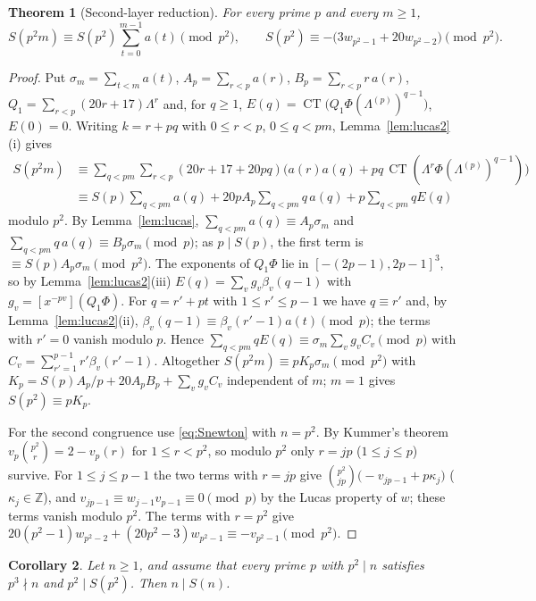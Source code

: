 \documentclass[11pt]{amsart}
\newtheorem{theorem}{Theorem}[section]
\newtheorem{corollary}[theorem]{Corollary}
\theoremstyle{definition}
\newcommand{\Z}{\mathbb{Z}}
\newcommand{\CT}{\operatorname{CT}}
\begin{document}
\begin{theorem}[Second-layer reduction]\label{thm:layer2}
For every prime $p$ and every $m\ge1$,
\[
S(p^2m)\equiv S(p^2)\sum_{t=0}^{m-1}a(t)\pmod{p^2},\qquad
S(p^2)\equiv-\big(3w_{p^2-1}+20w_{p^2-2}\big)\pmod{p^2}.
\]
\end{theorem}

\begin{proof}
Put $\sigma_m=\sum_{t<m}a(t)$, $A_p=\sum_{r<p}a(r)$, $B_p=\sum_{r<p}r\,a(r)$,
$Q_1=\sum_{r<p}(20r+17)\Lambda^r$ and, for $q\ge1$, $E(q)=\CT\big(Q_1\Phi(\Lambda^{(p)})^{q-1}\big)$,
$E(0)=0$. Writing $k=r+pq$ with $0\le r<p$, $0\le q<pm$, Lemma~\ref{lem:lucas2}(i) gives
\begin{align*}
S(p^2m)&\equiv\sum_{q<pm}\sum_{r<p}(20r+17+20pq)\big(a(r)a(q)+pq\,\CT(\Lambda^r\Phi(\Lambda^{(p)})^{q-1})\big)\\
&\equiv S(p)\sum_{q<pm}a(q)+20pA_p\sum_{q<pm}q\,a(q)+p\sum_{q<pm}qE(q)
\end{align*}
modulo $p^2$. By Lemma~\ref{lem:lucas}, $\sum_{q<pm}a(q)\equiv A_p\sigma_m$ and
$\sum_{q<pm}q\,a(q)\equiv B_p\sigma_m\pmod p$; as $p\mid S(p)$, the first term is
$\equiv S(p)A_p\sigma_m\pmod{p^2}$. The exponents of $Q_1\Phi$ lie in $[-(2p-1),2p-1]^3$, so by
Lemma~\ref{lem:lucas2}(iii) $E(q)=\sum_{v}g_v\beta_v(q-1)$ with $g_v=[x^{-pv}](Q_1\Phi)$. For
$q=r'+pt$ with $1\le r'\le p-1$ we have $q\equiv r'$ and, by Lemma~\ref{lem:lucas2}(ii),
$\beta_v(q-1)\equiv\beta_v(r'-1)a(t)\pmod p$; the terms with $r'=0$ vanish modulo $p$. Hence
$\sum_{q<pm}qE(q)\equiv\sigma_m\sum_vg_vC_v\pmod p$ with $C_v=\sum_{r'=1}^{p-1}r'\beta_v(r'-1)$.
Altogether $S(p^2m)\equiv pK_p\sigma_m\pmod{p^2}$ with
$K_p=S(p)A_p/p+20A_pB_p+\sum_vg_vC_v$ independent of $m$; $m=1$ gives $S(p^2)\equiv pK_p$.

For the second congruence use \eqref{eq:Snewton} with $n=p^2$. By Kummer's theorem
$v_p\binom{p^2}r=2-v_p(r)$ for $1\le r<p^2$, so modulo $p^2$ only $r=jp$ ($1\le j\le p$) survive.
For $1\le j\le p-1$ the two terms with $r=jp$ give $\binom{p^2}{jp}\big(-v_{jp-1}+p\kappa_j\big)$
($\kappa_j\in\Z$), and $v_{jp-1}\equiv w_{j-1}v_{p-1}\equiv0\pmod p$ by the Lucas property of $w$;
these terms vanish modulo $p^2$. The terms with $r=p^2$ give
$20(p^2-1)w_{p^2-2}+(20p^2-3)w_{p^2-1}\equiv-v_{p^2-1}\pmod{p^2}$.
\end{proof}

\begin{corollary}\label{cor:cubefree}
Let $n\ge1$, and assume that every prime $p$ with $p^2\mid n$ satisfies $p^3\nmid n$ and
$p^2\mid S(p^2)$. Then $n\mid S(n)$.
\end{corollary}
\end{document}
